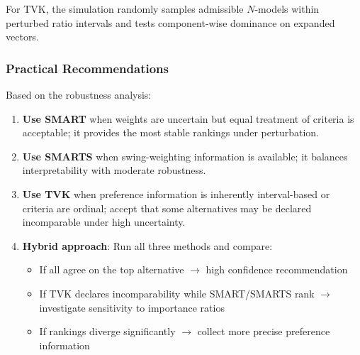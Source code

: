 \documentclass[conference]{IEEEtran}
\begin{document}
For TVK, the simulation randomly samples admissible $N$-models within perturbed ratio intervals and tests component-wise dominance on expanded vectors.

\subsubsection{Practical Recommendations}

Based on the robustness analysis:

\begin{enumerate}
	\item \textbf{Use SMART} when weights are uncertain but equal treatment of criteria is acceptable; it provides the most stable rankings under perturbation.
	
	\item \textbf{Use SMARTS} when swing-weighting information is available; it balances interpretability with moderate robustness.
	
	\item \textbf{Use TVK} when preference information is inherently interval-based or criteria are ordinal; accept that some alternatives may be declared incomparable under high uncertainty.
	
	\item \textbf{Hybrid approach}: Run all three methods and compare:
	\begin{itemize}
		\item If all agree on the top alternative $\rightarrow$ high confidence recommendation
		\item If TVK declares incomparability while SMART/SMARTS rank $\rightarrow$ investigate sensitivity to importance ratios
		\item If rankings diverge significantly $\rightarrow$ collect more precise preference information
	\end{itemize}
\end{enumerate}
\end{document}
